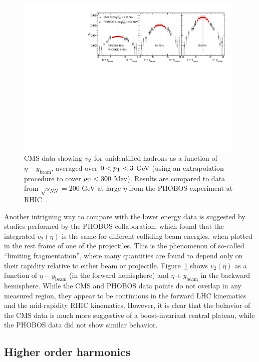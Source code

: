 \begin{figure}[!tb]
\begin{center}
\includegraphics[width=0.98\textwidth]{flowcorrelations_figs/v2_etashifted_3cen_PHOBOS.pdf}
\caption[]{
CMS data showing $\mbox{$v_2$}$ for unidentified hadrons as a function of $\eta - y_{\mathrm{beam}}$, averaged over $0 <\mbox{$p_{\mathrm{T}}$} < 3$ GeV (using an extrapolation procedure to cover $\mbox{$p_{\mathrm{T}}$} <300$ Mev).
Results are compared to data from $\sqrt{s_{NN}}=200$ GeV
at large $\eta$ from the PHOBOS experiment at RHIC~\cite{Chatrchyan:2012ta}.
}
\label{fig:pas:fc:limfrag}
\end{center}
\end{figure}
Another intriguing way to compare with the lower energy data is suggested by studies performed by the PHOBOS
collaboration, which found that the integrated $v_2(\eta)$ is the same for different colliding beam energies,
when plotted in the rest frame of one of the projectiles.  This is the phenomenon of so-called
``limiting fragmentation'', where many quantities are found to depend only on their rapidity relative to either
beam or projectile.
Figure~\ref{fig:pas:fc:limfrag} shows $v_2(\eta)$ as a function of $\eta - y_{\mathrm{beam}}$ (in the forward
hemisphere) and $\eta + y_{\mathrm{beam}}$ in the backward hemisphere.
While the CMS and PHOBOS data points do not overlap in any measured region, they appear to be continuous
in the forward LHC kinematics and the mid-rapidity RHIC kinematics.
However, it is clear that the behavior of the CMS data is much more suggestive of a boost-invariant central
plateau, while the PHOBOS data did not show similar behavior.

\subsection{Higher order harmonics}

